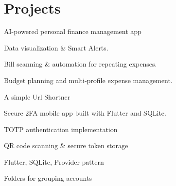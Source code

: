 \documentclass[]{deedy-resume-reversed}
\begin{document}
\begin{minipage}[t]{0.60\textwidth}

\section{Projects}

\begin{tightemize}

\item AI-powered personal finance management app 
\item Data visualization \& Smart Alerts.
\item Bill scanning \& automation for repeating expenses. 
\item Budget planning and multi-profile expense management.
\end{tightemize}
\sectionsep

\begin{tightemize}
\item A simple Url Shortner
\end{tightemize}

\sectionsep

\begin{tightemize}
\item Secure 2FA mobile app built with Flutter and SQLite.
\item TOTP authentication implementation
\item QR code scanning \& secure token storage
\item Flutter, SQLite, Provider pattern
\item Folders for grouping accounts
\end{tightemize}

\sectionsep


\end{minipage}
\end{document}
